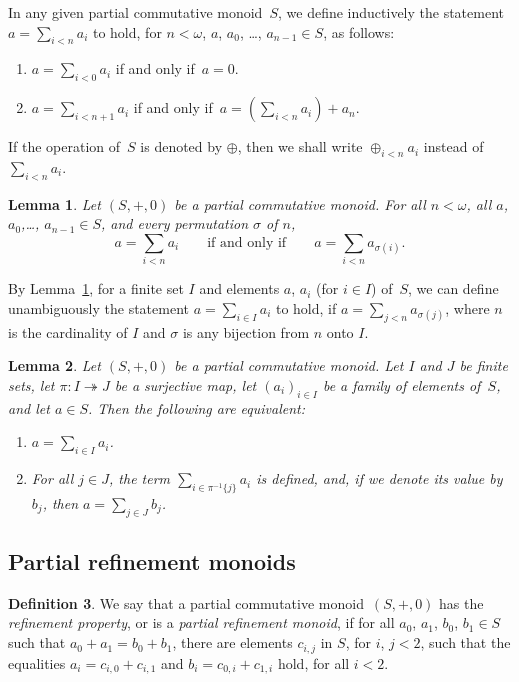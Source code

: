 \documentclass[psamsfonts,reqno]{memo-l}
\theoremstyle{plain}
\newtheorem{lemma}{Lemma}[section]
\theoremstyle{definition}
\newtheorem{definition}[lemma]{Definition}
\theoremstyle{remark}
\numberwithin{equation}{section}
\renewcommand{\iff}{if and only if}
\newcommand{\pcm}{partial commutative mon\-oid}
\newcommand{\prm}{partial refinement mon\-oid}
\newcommand{\set}[1]{\{#1\}}
\newcommand{\famm}[2]{(#1)_{#2}}
\begin{document}
In any given \pcm{}\ $S$, we define
inductively the statement
$a=\sum_{i<n}a_i$ to hold, for $n<\omega$, $a$, $a_0$, \dots,
$a_{n-1}\in S$, as follows:
\begin{enumerate}
\item $a=\sum_{i<0}a_i$ \iff\ $a=0$.

\item $a=\sum_{i<n+1}a_i$ \iff\ $a=\left(\sum_{i<n}a_i\right)+a_n$.
\end{enumerate}

If the operation of~$S$ is denoted by $\oplus$, then we shall write
$\oplus_{i<n}a_i$ instead of~$\sum_{i<n}a_i$.

\begin{lemma}\label{L:InvPermPlus}
Let $(S,+,0)$ be a \pcm.
For all $n<\omega$, all $a$, $a_0$,\dots, $a_{n-1}\in S$, and every
permutation $\sigma$ of $n$,
   \[
   a=\sum_{i<n}a_i\qquad\text{\iff}\qquad a=\sum_{i<n}a_{\sigma(i)}.
   \]
\end{lemma}

By Lemma~\ref{L:InvPermPlus}, for a finite set $I$ and elements $a$, $a_i$
(for $i\in I$) of~$S$, we can define unambiguously the statement
$a=\sum_{i\in I}a_i$ to hold, if $a=\sum_{j<n}a_{\sigma(j)}$, where $n$
is the cardinality of $I$ and $\sigma$ is any bijection from $n$ onto $I$.

\begin{lemma}\label{L:SetAssoc}
Let $(S,+,0)$ be a \pcm. Let $I$ and $J$
be finite sets, let
$\pi\colon I\twoheadrightarrow J$ be a surjective map, let
$\famm{a_i}{i\in I}$ be a family of elements of~$S$, and let $a\in S$.
Then the following are equivalent:

\begin{enumerate}
\item $a=\sum_{i\in I}a_i$.

\item For all $j\in J$, the term $\sum_{i\in\pi^{-1}\set{j}}a_i$ is defined,
and, if we denote its value by~$b_j$, then $a=\sum_{j\in J}b_j$.
\end{enumerate}

\end{lemma}

\subsection{Partial refinement monoids}
\begin{definition}\label{D:RefPpty}
We say that a \pcm{}\ $(S,+,0)$ has the
\emph{refinement property}, or is a
\emph{\prm}, if for all $a_0$, $a_1$, $b_0$, $b_1\in S$ such that
$a_0+a_1=b_0+b_1$, there are elements $c_{i,j}$ in $S$, for $i$, $j<2$, such
that the equalities $a_i=c_{i,0}+c_{i,1}$ and $b_i=c_{0,i}+c_{1,i}$ hold,
for all $i<2$.
\end{definition}
\end{document}
